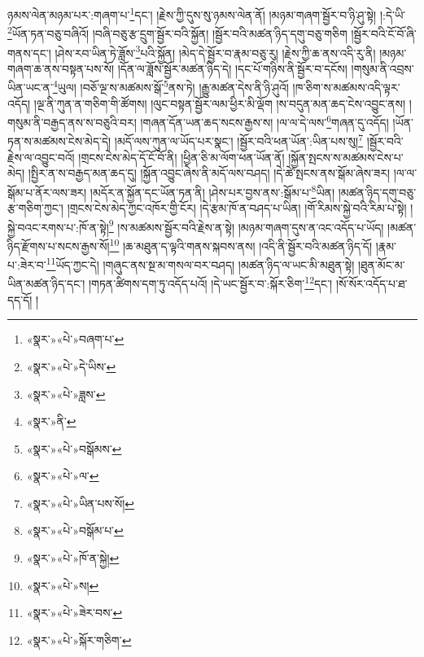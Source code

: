 ཉམས་ལེན་མཉམ་པར་:གཞག་པ་\footnote{«སྣར་»«པེ་»བཞག་པ་}དང་། །རྗེས་ཀྱི་དུས་སུ་ཉམས་ལེན་ནོ། །མཉམ་གཞག་སྦྱོར་བ་ཉི་ཤུ་སྟེ། །:དེ་ཡི་\footnote{«སྣར་»«པེ་»དེ་ཡིས་}ཡོན་ཏན་བཅུ་བཞིའོ། །བཞི་བཅུ་རྩ་དྲུག་སྦྱོར་བའི་སྐྱོན། །སྦྱོར་བའི་མཚན་ཉིད་དགུ་བཅུ་གཅིག །སྦྱོར་བའི་ངོ་བོ་ཞི་གནས་དང་། །ཤེས་རབ་ཡིན་ཏེ་ཟློས་\footnote{«སྣར་»«པེ་»ཟླས་}པའི་སྐྱོན། །མེད་དེ་སྦྱོར་བ་རྣམ་བཅུ་རུ། །རྗེས་ཀྱི་ཆ་ནས་འདི་རུ་ནི། །མཉམ་གཞག་ཆ་ནས་བསྟན་པས་སོ། །དོན་ལ་ཟློས་སྦྱོར་མཚན་ཉིད་དེ། །དང་པོ་གཉིས་ནི་སྦྱོར་བ་དངོས། །གསུམ་ནི་འབྲས་ཡིན་ཡང་ན་\footnote{«སྣར་»ནི་}ཡུལ། །བཅོ་ལྔ་ས་མཚམས་སྒོ་\footnote{«སྣར་»«པེ་»བསྒོམས་}ནས་ཏེ། །རྒྱུ་མཚན་དེས་ནི་ཉི་ཤུའོ། །ཁ་ཅིག་ས་མཚམས་འདི་ལྟར་འདོད། །ལྔ་ནི་ཀུན་ན་གཅིག་གི་ཚོགས། །ལུང་བསྟན་སྦྱོར་ལམ་ཕྱིར་མི་ལྡོག །ས་བདུན་མན་ཆད་ངེས་འབྱུང་ནས། །གསུམ་ནི་བརྒྱད་ནས་ས་བཅུའི་བར། །གཞན་དོན་ཡན་ཆད་སངས་རྒྱས་ས། །ལ་ལ་དེ་ལས་\footnote{«སྣར་»«པེ་»ལ་}གཞན་དུ་འདོད། །ཡོན་ཏན་ས་མཚམས་ངེས་མེད་དེ། །མདོ་ལས་ཀུན་ལ་ཡོད་པར་སྣང་། །སྦྱོར་བའི་ཕན་ཡོན་:ཡིན་པས་སུ།\footnote{«སྣར་»«པེ་»ཡིན་པས་སོ།} །སྦྱོར་བའི་རྗེས་ལ་འབྱུང་བའོ། །གྲངས་ངེས་མེད་དོ་ངོ་བོ་ནི། །ཕྱིན་ཅི་མ་ལོག་ཕན་ཡོན་ནོ། །སྐྱོན་སྤངས་ས་མཚམས་ངེས་པ་མེད། །སྤྱིར་ན་ས་བརྒྱད་མན་ཆད་དུ། །སྐྱོན་འབྱུང་ཞེས་ནི་མདོ་ལས་བཤད། །དེ་ཚེ་སྤངས་ནས་སྒོམ་ཞེས་ཟར། །ལ་ལ་སྒོམ་པ་ནོར་ལས་ཟར། །མདོར་ན་སྐྱོན་དང་ཡོན་ཏན་ནི། །ཤེས་པར་བྱས་ནས་:སྒོམ་པ་\footnote{«སྣར་»«པེ་»བསྒོམ་པ་}ཡིན། །མཚན་ཉིད་དགུ་བཅུ་རྩ་གཅིག་ཀྱང་། །གྲངས་ངེས་མེད་ཀྱང་འཁོར་གྱི་ངོར། །དེ་རྩམ་ཁོ་ན་བཤད་པ་ཡིན། །གོ་རིམས་སྐྱེ་བའི་རིམ་པ་སྟེ། །སྐྱེ་བའང་རགས་པ་:ཁོ་ན་སྟེ།\footnote{«སྣར་»«པེ་»ཁོ་ན་སྐྱེ།} །ས་མཚམས་སྦྱོར་བའི་རྗེས་ན་སྟེ། །མཉམ་གཞག་དུས་ན་འང་འདོད་པ་ཡོད། །མཚན་ཉིད་རྫོགས་པ་སངས་རྒྱས་སོ།\footnote{«སྣར་»«པེ་»ས།} །ཆ་མཐུན་ད་ལྟའི་གནས་སྐབས་ནས། །འདི་ནི་སྦྱོར་བའི་མཚན་ཉིད་དོ། །རྣམ་པ་:ཟེར་བ་\footnote{«སྣར་»«པེ་»ཟེར་བས་}ཡོད་ཀྱང་དེ། །གཞུང་ནས་སྔ་མ་གསལ་བར་བཤད། །མཚན་ཉིད་ལ་ཡང་མི་མཐུན་སྟེ། །ཐུན་མོང་མ་ཡིན་མཚན་ཉིད་དང་། །གཏན་ཚིགས་དག་ཏུ་འདོད་པའོ། །དེ་ཡང་སྦྱོར་བ་:སྐོར་ཅིག་\footnote{«སྣར་»«པེ་»སྐོར་གཅིག་}དང་། །སོ་སོར་འདོད་པ་ཐ་དད་དོ། །
